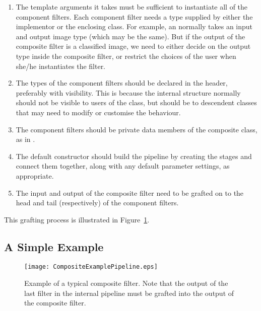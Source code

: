 \begin{enumerate}

\item The template arguments it takes must be sufficient to instantiate all of
the component filters.  Each component filter needs a type supplied by either
the implementor or the enclosing class.  For example, an
 normally takes an input and output image type (which
may be the same).  But if the output of the composite filter is a classified
image, we need to either decide on the output type inside the composite filter,
or restrict the choices of the user when she/he instantiates the filter.

\item The types of the component filters should be declared in the header,
  preferably with  visibility.  This is because the
  internal structure normally should not be visible to users of the class,
  but should be to descendent classes that may need to modify or customise
  the behaviour. 

\item The component filters should be private data members of the composite
  class, as in . 

\item The default constructor should build the pipeline by creating the
  stages and connect them together, along with any default parameter
  settings, as appropriate. 

\item The input and output of the composite filter need to be grafted on to
  the head and tail (respectively) of the component filters. 

\end{enumerate}

This grafting process is illustrated in Figure~\ref{fig:CompositeExamplePipeline}. 


\subsection{A Simple Example}

\begin{figure}
  \centering
  \texttt{[image: CompositeExamplePipeline.eps]}
  \caption{Example of a typical composite filter. Note that the output of the last filter in the internal pipeline must be grafted into the output of the composite filter.} 
  \label{fig:CompositeExamplePipeline}
\end{figure}



